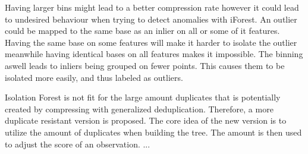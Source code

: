 Having larger bins might lead to a better compression rate however it could lead to undesired behaviour when trying to detect anomalies with iForest. An outlier could be mapped to the same base as an inlier on all or some of it features. Having the same base on some features will make it harder to isolate the outlier meanwhile having identical bases on all features makes it impossible. The binning aswell leads to inliers being grouped on fewer points. This causes them to be isolated more easily, and thus labeled as outliers.   

Isolation Forest is not fit for the large amount duplicates that is potentially created by compressing with generalized deduplication. Therefore, a more duplicate resistant version is proposed. The core idea of the new version is to utilize the amount of duplicates when building the tree. The amount is then used to adjust the score of an observation. ...        


% 
